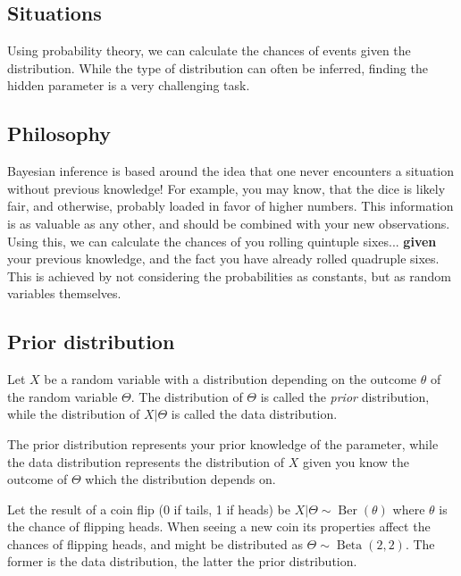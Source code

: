 \subsection{Situations} %
Using probability theory, we can calculate the chances of events given the distribution. While the type of distribution can often be inferred, finding the hidden parameter is a very challenging task.


\subsection{Philosophy}
Bayesian inference is based around the idea that one never encounters a situation without previous knowledge! For example, you may know, that the dice is likely fair, and otherwise, probably loaded in favor of higher numbers. This information is as valuable as any other, and should be combined with your new observations. Using this, we can calculate the chances of you rolling quintuple sixes... \textbf{given} your previous knowledge, and the fact you have already rolled quadruple sixes. This is achieved by not considering the probabilities as constants, but as random variables themselves.

\subsection{Prior distribution}
\begin{definition}
	Let \(X\) be a random variable with a distribution depending on the outcome \(\theta \) of the random variable \(\Theta \). The distribution of \(\Theta \) is called the \textit{prior} distribution, while the distribution of \(X|\Theta \) is called the data distribution.

	The prior distribution represents your prior knowledge of the parameter, while the data distribution represents the distribution of \(X\) given you know the outcome of \(\Theta \) which the distribution depends on. 
\end{definition}

\begin{example}
	Let the result of a coin flip (0 if tails, 1 if heads) be \(X|\Theta \sim \operatorname{Ber}(\theta )\) where \(\theta\) is the chance of flipping heads. When seeing a new coin its properties affect the chances of flipping heads, and might be distributed as \(\Theta \sim \operatorname{Beta}(2, 2)\). The former is the data distribution, the latter the prior distribution.
\end{example}

